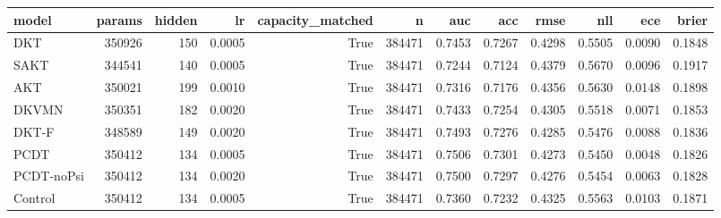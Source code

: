 \begin{tabular}{lrrrrrrrrrrr}
\toprule
model & params & hidden & lr & capacity\_matched & n & auc & acc & rmse & nll & ece & brier \\
\midrule
DKT & 350926 & 150 & 0.0005 & True & 384471 & 0.7453 & 0.7267 & 0.4298 & 0.5505 & 0.0090 & 0.1848 \\
SAKT & 344541 & 140 & 0.0005 & True & 384471 & 0.7244 & 0.7124 & 0.4379 & 0.5670 & 0.0096 & 0.1917 \\
AKT & 350021 & 199 & 0.0010 & True & 384471 & 0.7316 & 0.7176 & 0.4356 & 0.5630 & 0.0148 & 0.1898 \\
DKVMN & 350351 & 182 & 0.0020 & True & 384471 & 0.7433 & 0.7254 & 0.4305 & 0.5518 & 0.0071 & 0.1853 \\
DKT-F & 348589 & 149 & 0.0020 & True & 384471 & 0.7493 & 0.7276 & 0.4285 & 0.5476 & 0.0088 & 0.1836 \\
PCDT & 350412 & 134 & 0.0005 & True & 384471 & 0.7506 & 0.7301 & 0.4273 & 0.5450 & 0.0048 & 0.1826 \\
PCDT-noPsi & 350412 & 134 & 0.0020 & True & 384471 & 0.7500 & 0.7297 & 0.4276 & 0.5454 & 0.0063 & 0.1828 \\
Control & 350412 & 134 & 0.0005 & True & 384471 & 0.7360 & 0.7232 & 0.4325 & 0.5563 & 0.0103 & 0.1871 \\
\bottomrule
\end{tabular}
